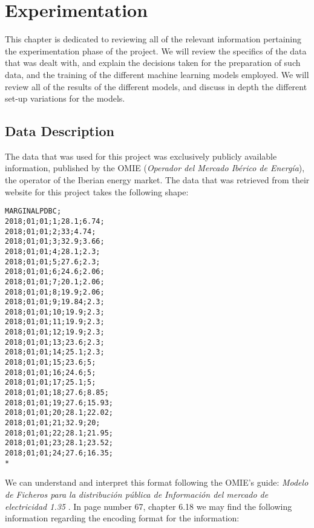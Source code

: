 \documentclass[12pt]{report} %
\begin{document}
\chapter{Experimentation}
This chapter is dedicated to reviewing all of the relevant information pertaining the experimentation phase of the project. We will review the specifics of the data that was dealt with, and explain the decisions taken for the preparation of such data, and the training of the different machine learning models employed. We will review all of the results of the different models, and discuss in depth the different set-up variations for the models.


\section{Data Description} %
The data that was used for this project was exclusively publicly available information, published by the OMIE (\textit{Operador del Mercado Ibérico de Energía}), the operator of the Iberian energy market. The data that was retrieved from their website \cite{omie_datos} for this project takes the following shape:

\begin{small}
\begin{verbatim}
MARGINALPDBC;
2018;01;01;1;28.1;6.74;
2018;01;01;2;33;4.74;
2018;01;01;3;32.9;3.66;
2018;01;01;4;28.1;2.3;
2018;01;01;5;27.6;2.3;
2018;01;01;6;24.6;2.06;
2018;01;01;7;20.1;2.06;
2018;01;01;8;19.9;2.06;
2018;01;01;9;19.84;2.3;
2018;01;01;10;19.9;2.3;
2018;01;01;11;19.9;2.3;
2018;01;01;12;19.9;2.3;
2018;01;01;13;23.6;2.3;
2018;01;01;14;25.1;2.3;
2018;01;01;15;23.6;5;
2018;01;01;16;24.6;5;
2018;01;01;17;25.1;5;
2018;01;01;18;27.6;8.85;
2018;01;01;19;27.6;15.93;
2018;01;01;20;28.1;22.02;
2018;01;01;21;32.9;20;
2018;01;01;22;28.1;21.95;
2018;01;01;23;28.1;23.52;
2018;01;01;24;27.6;16.35;
*
\end{verbatim}
\end{small}

We can understand and interpret this format following the OMIE's guide: \textit{Modelo de Ficheros para la distribución pública de Información del mercado de electricidad 1.35} \cite{omie_formatos_2024}. In page number 67, chapter 6.18 we may find the following information regarding the encoding format for the information:
\end{document}
